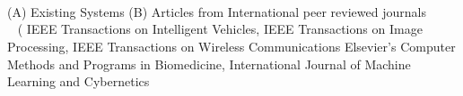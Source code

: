 ~\\~\\~

\indent (A)  Existing Systems \newline
\indent (B)  Articles from International peer reviewed journals \newline
~\\~
( IEEE Transactions on Intelligent Vehicles, IEEE Transactions on Image Processing,
IEEE Transactions on Wireless Communications
Elsevier’s Computer Methods and Programs in Biomedicine,
International Journal of Machine Learning and Cybernetics